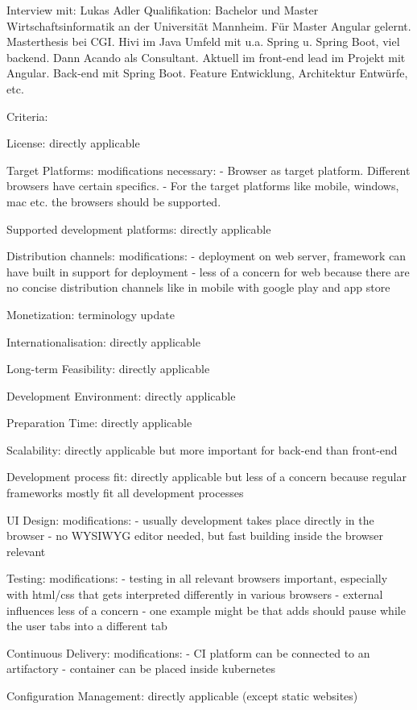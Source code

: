 Interview mit: Lukas Adler
Qualifikation: 
Bachelor und Master Wirtschaftsinformatik an der Universität Mannheim.
Für Master Angular gelernt. Masterthesis bei CGI.
Hivi im Java Umfeld mit u.a. Spring u. Spring Boot, viel backend.
Dann Acando als Consultant.
Aktuell im front-end lead im Projekt mit Angular. Back-end mit Spring Boot.
Feature Entwicklung, Architektur Entwürfe, etc.

Criteria: 

License: 
directly applicable

Target Platforms: 
modifications necessary: 
- Browser as target platform. Different browsers have certain specifics.
- For the target platforms like mobile, windows, mac etc. the browsers should be supported.

Supported development platforms: 
directly applicable

Distribution channels:
modifications: 
- deployment on web server, framework can have built in support for deployment
- less of a concern for web because there are no concise distribution channels like in mobile with google play and app store

Monetization: 
terminology update

Internationalisation: 
directly applicable

Long-term Feasibility: 
directly applicable

Development Environment:
directly applicable

Preparation Time: 
directly applicable

Scalability: 
directly applicable but more important for back-end than front-end

Development process fit: 
directly applicable but less of a concern because regular frameworks mostly fit all development processes

UI Design: 
modifications: 
- usually development takes place directly in the browser
- no WYSIWYG editor needed, but fast building inside the browser relevant

Testing: 
modifications: 
- testing in all relevant browsers important, especially with html/css that gets interpreted differently in various browsers
- external influences less of a concern
- one example might be that adds should pause while the user tabs into a different tab

Continuous Delivery: 
modifications: 
- CI platform can be connected to an artifactory
- container can be placed inside kubernetes

Configuration Management: 
directly applicable (except static websites)


